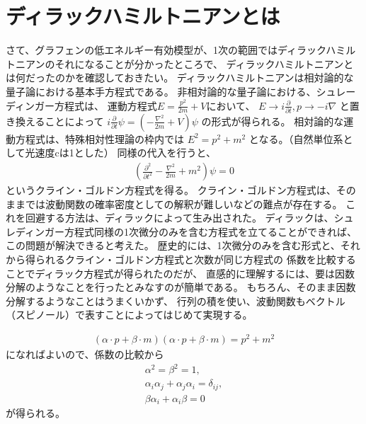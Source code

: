 \documentclass{article}
\begin{document}
\section{ディラックハミルトニアンとは}
さて、グラフェンの低エネルギー有効模型が、1次の範囲ではディラックハミルトニアンのそれになることが分かったところで、
ディラックハミルトニアンとは何だったのかを確認しておきたい。
ディラックハミルトニアンは相対論的な量子論における基本手方程式である。
非相対論的な量子論における、シュレーディンガー方程式は、
運動方程式$E=\frac{p^2}{2m}+V$において、
$E \rightarrow i\frac{\partial }{\partial t}, p\rightarrow -i \nabla$
と置き換えることによって
$i\frac{\partial }{\partial t}\psi=\left (-\frac{\nabla^2}{2m}+V \right )\psi$
の形式が得られる。
相対論的な運動方程式は、特殊相対性理論の枠内では
$E^2=p^2+m^2$
となる。（自然単位系として光速度cは1とした）
同様の代入を行うと、
\begin{eqnarray}
\left ( \frac{\partial^2}{\partial t^2}- \frac{\nabla^2}{2m}+m^2\right)\psi =0
\end{eqnarray}
というクライン・ゴルドン方程式を得る。
クライン・ゴルドン方程式は、そのままでは波動関数の確率密度としての解釈が難しいなどの難点が存在する。
これを回避する方法は、ディラックによって生み出された。
ディラックは、シュレディンガー方程式同様の1次微分のみを含む方程式を立てることができれば、
この問題が解決できると考えた。
歴史的には、1次微分のみを含む形式と、それから得られるクライン・ゴルドン方程式と次数が同じ方程式の
係数を比較することでディラック方程式が得られたのだが、
直感的に理解するには、要は因数分解のようなことを行ったとみなすのが簡単である。
もちろん、そのまま因数分解するようなことはうまくいかず、
行列の積を使い、波動関数もベクトル（スピノール）で表すことによってはじめて実現する。

\begin{eqnarray}
(\alpha \cdot p+\beta \cdot m)(\alpha \cdot p+\beta \cdot m)=p^2+m^2
\end{eqnarray}
になればよいので、係数の比較から
\begin{eqnarray}
\alpha^2=\beta^2=1,\\
\alpha_i\alpha_j+\alpha_j\alpha_i=\delta_{ij}, \\
\beta\alpha_i+\alpha_i\beta=0
\end{eqnarray}
が得られる。
\end{document}
